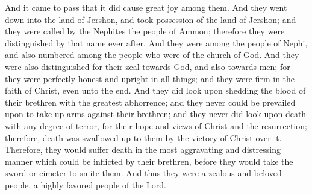 \bverse \iffalse And it came to pass that it did cause great joy among them.  And they went down into the land of Jershon, and took possession of the land of Jershon; and they were called by the Nephites the people of Ammon; therefore they were distinguished by that name ever after. \fi
And it came to pass that it did cause great joy among them.  And they went down into the land of Jershon, and took possession of the land of Jershon; and they were called by the Nephites the people of Ammon; therefore they were distinguished by that name ever after.
\bverse \iffalse And they were among the people of Nephi, and also numbered among the people who were of the church of God. And they were also distinguished for their zeal towards God, and also towards men; for they were perfectly honest and upright in all things; and they were firm in the faith of Christ, even unto the end. \fi
And they were among the people of Nephi, and also numbered among the people who were of the church of God. And they were also distinguished for their zeal towards God, and also towards men; for they were perfectly honest and upright in all things; and they were firm in the faith of Christ, even unto the end.
\bverse \iffalse And they did look upon shedding the blood of their brethren with the greatest abhorrence; and they never could be prevailed upon to take up arms against their brethren; and they never did look upon death with any degree of terror, for their hope and views of Christ and the resurrection; therefore, death was swallowed up to them by the victory of Christ over it. \fi
And they did look upon shedding the blood of their brethren with the greatest abhorrence; and they never could be prevailed upon to take up arms against their brethren; and they never did look upon death with any degree of terror, for their hope and views of Christ and the resurrection; therefore, death was swallowed up to them by the victory of Christ over it.
\bverse \iffalse Therefore, they would suffer death in the most aggravating and distressing manner which could be inflicted by their brethren, before they would take the sword or cimeter to smite them. \fi
Therefore, they would suffer death in the most aggravating and distressing manner which could be inflicted by their brethren, before they would take the sword or cimeter to smite them.
\bverse \iffalse And thus they were a zealous and beloved people, a highly favored people of the Lord. \fi
And thus they were a zealous and beloved people, a highly favored people of the Lord.
